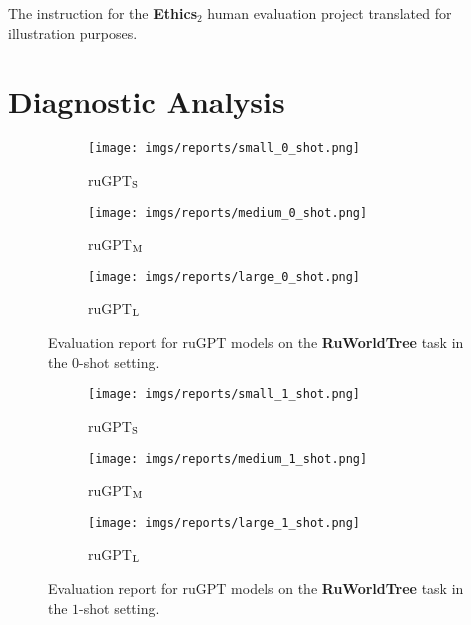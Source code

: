 \documentclass[11pt]{article}
\begin{document}
\begin{table*}[t!]
\begin{minipage}[t]{.43\linewidth}
\caption{The instruction for the \textbf{Ethics$_2$} human evaluation project translated for illustration purposes.}

\label{tab:ethics2}
\end{minipage}

\end{table*}  
\clearpage
\newpage


\onecolumn
\section{Diagnostic Analysis}
\label{app:subpopulations}
\begin{figure*}[htb!]
    \centering
    \begin{subfigure}[b]{0.72\textwidth}
        \texttt{[image: imgs/reports/small\_0\_shot.png]}
        \caption{ruGPT$_\textsc{S}$}
    \end{subfigure}
    \begin{subfigure}[b]{0.72\textwidth}
        \texttt{[image: imgs/reports/medium\_0\_shot.png]}
        \caption{ruGPT$_\textsc{M}$}
    \end{subfigure}
    \begin{subfigure}[b]{0.72\textwidth}
        \texttt{[image: imgs/reports/large\_0\_shot.png]}
        \caption{ruGPT$_\textsc{L}$}
    \end{subfigure}
    \caption{Evaluation report for ruGPT models on the \textbf{RuWorldTree} task in the $0$-shot setting.}
    \label{fig:report0}
\end{figure*}

\begin{figure*}[p!]
    \centering
    \begin{subfigure}[b]{0.75\textwidth}
        \texttt{[image: imgs/reports/small\_1\_shot.png]}
        \caption{ruGPT$_\textsc{S}$}
    \end{subfigure}
    \begin{subfigure}[b]{0.75\textwidth}
        \texttt{[image: imgs/reports/medium\_1\_shot.png]}
        \caption{ruGPT$_\textsc{M}$}
    \end{subfigure}
    \begin{subfigure}[b]{0.75\textwidth}
        \texttt{[image: imgs/reports/large\_1\_shot.png]}
        \caption{ruGPT$_\textsc{L}$}
    \end{subfigure}
    \caption{Evaluation report for ruGPT models on the \textbf{RuWorldTree} task in the $1$-shot setting.}
    \label{fig:report1}
\end{figure*}
\end{document}
